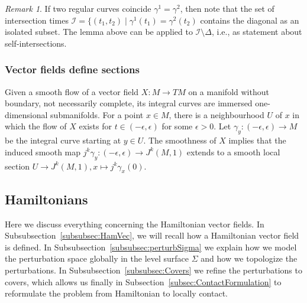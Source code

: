 \documentclass{amsart}
\newcommand{\Ical}{{\mathcal{I}}}
\theoremstyle{definition}
\theoremstyle{remark}
\newtheorem{remark}[proposition]{Remark}
\numberwithin{equation}{section}
\begin{document}
\begin{remark}
If two regular curves coincide $\gamma^1=\gamma^2$, then note that the set of intersection times $\Ical=\{(t_1,t_2)\mid \gamma^1(t_1)=\gamma^2(t_2)$  contains the diagonal as an isolated subset. The lemma above can be applied to $\Ical\setminus \Delta$, i.e., as statement about self-intersections.
\end{remark}


\subsubsection{Vector fields define sections}
Given a smooth flow of a vector field $X:M\to TM$ on a manifold without boundary, not necessarily complete, its integral curves are immersed one-dimensional submanifolds. For a point $x\in M$, there is a neighbourhood $U$ of $x$ in which the flow of $X$ exists for $t\in (-\epsilon,\epsilon)$ for some $\epsilon>0$. Let $\gamma_y:(-\epsilon,\epsilon)\to M$ be the integral curve starting at $y\in U$. The smoothness of $X$ implies that the induced smooth map $j^k\gamma_y:(-\epsilon,\epsilon)\to J^k(M,1)$ extends to a smooth local section $U\to J^k(M,1), x\mapsto j^k\gamma_x(0)$. 








\subsection{Hamiltonians}
Here we discuss everything concerning the Hamiltonian vector fields. In Subsubsection~\ref{subsubsec:HamVec}, we will recall how a Hamiltonian vector field is defined. In Subsubsection~\ref{subsubsec:perturbSigma} we explain how we model the perturbation space globally in the level surface $\Sigma$ and how we topologize the perturbations. In Subsubsection~\ref{subsubsec:Covers} we refine the perturbations to covers, which allows us finally in Subsection~\ref{subsec:ContactFormulation} to reformulate the problem from Hamiltonian to locally contact.
\end{document}
